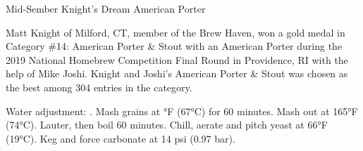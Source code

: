 \documentclass[fontsize=9pt,oneside]{scrbook}
\begin{document}
\mainmatter


\begin{recipe}{Mid-Sember Knight's Dream American Porter}

\begin{aboutblock}
Matt Knight of Milford, CT, member of the Brew Haven, won a gold medal in
Category \#14: American Porter \& Stout with an American Porter during the 2019
National Homebrew Competition Final Round in Providence, RI with the help of Mike
Joshi. Knight and Joshi's American Porter \& Stout was chosen as the best among
304 entries in the category. \sourceaha
\end{aboutblock}


\begin{methodandtiming}
 
\begin{mashsteps}
\end{mashsteps}

\begin{fermentationsteps}
\end{fermentationsteps}

\begin{directions}
Water adjustment: . 
Mash grains at °F (67°C) for 60 minutes. Mash out at 165°F (74°C). Lauter, then boil 60 minutes. Chill, aerate and pitch yeast at 66°F (19°C). Keg and force carbonate at 14 psi (0.97 bar).
\end{directions}

\end{methodandtiming}

\recipebreak

\begin{ingredientsblock}

\begin{malts}
\end{malts}

\begin{hops}
\end{hops}


\end{ingredientsblock}

\end{recipe}

\backmatter


\end{document}
